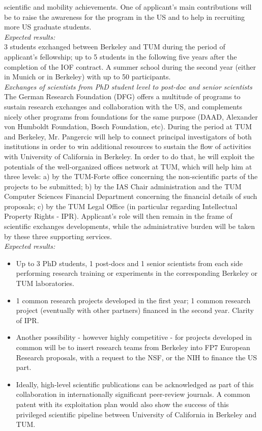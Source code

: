 scientific  and mobility  achievements. One  of applicant's  main contributions
will be to raise  the awareness for the program in the  US and to help
in recruiting more US graduate students.\\
\emph{Expected results:}\\
 3 students exchanged between Berkeley and TUM during
the period of  applicant's fellowship; up to 5 students  in the following five
years after the completion of the IOF contract. A summer school during
the  second year  (either in  Munich or  in Berkeley)  with up  to 50
participants. \\  
\emph{Exchanges of  scientists from  PhD student  level to
post-doc and  senior scientists}\\
 The German Research  Foundation (DFG) offers  a multitude  of  programs to  sustain  research exchanges  and
collaboration with the US,  and complements nicely other programs from
foundations  for  the  same  purpose  (DAAD,  Alexander  von  Humboldt
Foundation, Bosch Foundation, etc). During  the period at TUM and Berkeley, 
Mr. Pangercic will help to connect principal  investigators of both institutions in order
to win  additional resources  to sustain the  flow of  activities with
University  of California in  Berkeley. In  order to  do that,  he will
exploit the  potentials of  the well-organized offices  network at
TUM, which  will help him at  three levels: a) by  the TUM-Forte office
concerning the  non-scientific parts of the projects  to be submitted;
b)  by the  IAS Chair  administration and  the TUM  Computer Sciences
Financial  Department   concerning  the  financial   details  of  such
proposals;  c)  by  the  TUM  Legal Office  (in  particular  regarding
Intellectual Property Rights  - IPR). Applicant's role will  then remain in the
frame of  scientific exchanges developments,  while the administrative
burden  will be taken  by these  three supporting  services.\\
\emph{Expected results:}\\
\begin{itemize}
\item Up  to 3  PhD students, 1  post-docs and 1  senior scientists
from  each side  performing research  training or  experiments  in the
corresponding   Berkeley   or   TUM laboratories.  
\item 1 common research projects developed in the first year;
1 common research project (eventually with other partners) financed in
the second year. Clarity of IPR.  
\item Another possibility - however highly competitive  - for  projects developed
in  common will  be to  insert research  teams from  Berkeley  into FP7
European Research proposals, with a request  to the NSF, or the NIH to
finance the US part.   
\item Ideally, high-level scientific publications can
be  acknowledged  as part  of  this  collaboration in  internationally
significant   peer-review   journals.  A   common   patent  with   its
exploitation  plan would  also  show the  success  of this  privileged
scientific pipeline  between University of California  in Berkeley and
TUM.
\end{itemize}
